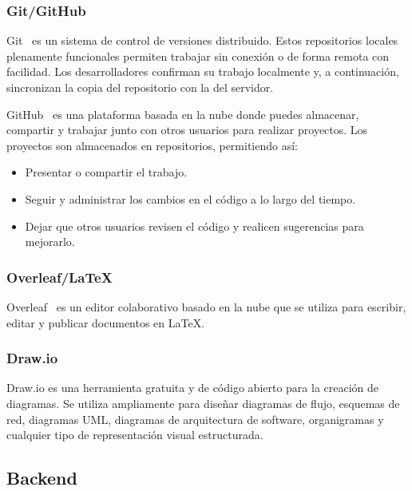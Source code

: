 
\subsubsection{Git/GitHub}
Git~\cite{Mc:Git} es un sistema de control de versiones distribuido. Estos repositorios locales plenamente funcionales permiten trabajar sin conexión o de forma remota con facilidad. Los desarrolladores confirman su trabajo localmente y, a continuación, sincronizan la copia del repositorio con la del servidor.


GitHub~\cite{Github} es una plataforma basada en la nube donde puedes almacenar, compartir y trabajar junto con otros usuarios para realizar proyectos. 
Los proyectos son almacenados en repositorios, permitiendo así:
\begin{itemize}
    \item Presentar o compartir el trabajo.
    \item Seguir y administrar los cambios en el código a lo largo del tiempo.
    \item Dejar que otros usuarios revisen el código y realicen sugerencias para mejorarlo.
\end{itemize}




\subsubsection{Overleaf/LaTeX}
Overleaf~\cite{Overleaf} es un editor colaborativo basado en la nube que se utiliza para escribir, editar y publicar documentos en LaTeX.


\subsubsection{Draw.io}
Draw.io es una herramienta gratuita y de código abierto para la creación de diagramas. Se utiliza ampliamente para diseñar diagramas de flujo, esquemas de red, diagramas UML, diagramas de arquitectura de software, organigramas y cualquier tipo de representación visual estructurada.


\subsection{Backend}
